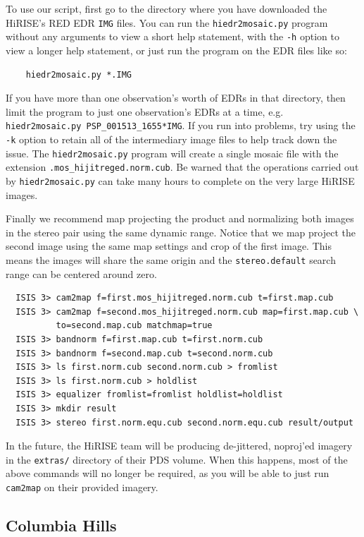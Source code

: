 To use our script, first go to the directory where you have downloaded
the HiRISE's RED EDR \texttt{IMG} files. You can run the 
\texttt{hiedr2mosaic.py} program without any arguments to view a short
help statement, with the \texttt{-h} option to view a longer help statement,
or just run the program on the EDR files like so:

\begin{verbatim}
    hiedr2mosaic.py *.IMG
\end{verbatim}

If you have more than one observation's worth of EDRs in that
directory, then limit the program to just one observation's EDRs
at a time, e.g. \texttt{hiedr2mosaic.py PSP\_001513\_1655*IMG}.  If you
run into problems, try using the \texttt{-k} option to retain all of 
the intermediary image files to help track down the issue.  The
\texttt{hiedr2mosaic.py} program will create a single mosaic file 
with the extension \texttt{.mos\_hijitreged.norm.cub}.  Be warned that
the operations carried out by \texttt{hiedr2mosaic.py} can take many 
hours to complete on the very large HiRISE images.


Finally we recommend map projecting the product and normalizing both
images in the stereo pair using the same dynamic range. Notice that we
map project the second image using the same map settings and crop of
the first image. This means the images will share the same origin and
the {\tt stereo.default} search range can be centered around zero.

\begin{verbatim}
  ISIS 3> cam2map f=first.mos_hijitreged.norm.cub t=first.map.cub
  ISIS 3> cam2map f=second.mos_hijitreged.norm.cub map=first.map.cub \
          to=second.map.cub matchmap=true
  ISIS 3> bandnorm f=first.map.cub t=first.norm.cub
  ISIS 3> bandnorm f=second.map.cub t=second.norm.cub
  ISIS 3> ls first.norm.cub second.norm.cub > fromlist
  ISIS 3> ls first.norm.cub > holdlist
  ISIS 3> equalizer fromlist=fromlist holdlist=holdlist
  ISIS 3> mkdir result
  ISIS 3> stereo first.norm.equ.cub second.norm.equ.cub result/output
\end{verbatim}

In the future, the HiRISE team will be producing de-jittered, noproj'ed
imagery in the \texttt{extras/} directory of their \ac{PDS} volume.
When this happens, most of the above commands will no longer be required,
as you will be able to just run \texttt{cam2map} on their provided imagery.

\subsection{Columbia Hills}

